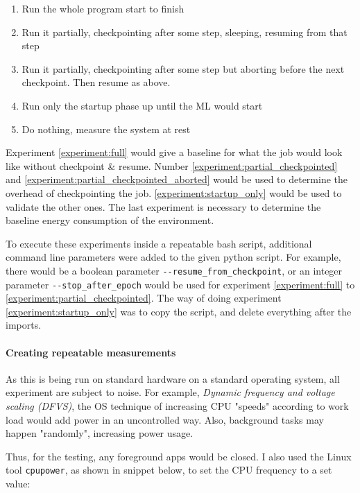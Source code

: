 \begin{enumerate}
    \item \label{experiment:full}Run the whole program start to finish
    \item \label{experiment:partial_checkpointed}Run it partially, checkpointing after some step, sleeping, resuming from that step
    \item \label{experiment:partial_checkpointed_aborted}Run it partially, checkpointing after some step but aborting before the next checkpoint. Then resume as above.
    \item \label{experiment:startup_only}Run only the startup phase up until the ML would start
    \item \label{experiment:baseline}Do nothing, measure the system at rest
\end{enumerate}

Experiment \ref{experiment:full} would give a baseline for what the job would look like without checkpoint \& resume. Number \ref{experiment:partial_checkpointed} and \ref{experiment:partial_checkpointed_aborted} would be used to determine the overhead of checkpointing the job. \ref{experiment:startup_only} would be used to validate the other ones. The last experiment is necessary to determine the baseline energy consumption of the environment.

To execute these experiments inside a repeatable bash script, additional command line parameters were added to the given python script. 
For example, there would be a boolean parameter \verb|--resume_from_checkpoint|, or an integer parameter \verb|--stop_after_epoch| would be used for experiment \ref{experiment:full} to \ref{experiment:partial_checkpointed}. 
The way of doing experiment \ref{experiment:startup_only} was to copy the script, and delete everything after the imports.

\paragraph{Creating repeatable measurements}

As this is being run on standard hardware on a standard operating system, all experiment are subject to noise. 
For example, \emph{Dynamic frequency and voltage scaling (DFVS)}, the OS technique of increasing CPU "speeds" according to work load would add power in an uncontrolled way. Also, background tasks may happen "randomly", increasing power usage. 

Thus, for the testing, any foreground apps would be closed. I also used the Linux tool \verb|cpupower|, as shown in snippet below, to set the CPU frequency to a set value:

